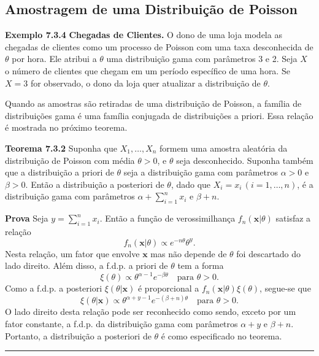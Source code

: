 \vspace{1cm}
\vspace{1cm}

\subsection*{Amostragem de uma Distribuição de Poisson}

\noindent\textbf{Exemplo 7.3.4} \quad \textbf{Chegadas de Clientes.} O dono de uma loja modela as chegadas de clientes como um processo de Poisson com uma taxa desconhecida de $\theta$ por hora. Ele atribui a $\theta$ uma distribuição gama com parâmetros 3 e 2. Seja $X$ o número de clientes que chegam em um período específico de uma hora. Se $X=3$ for observado, o dono da loja quer atualizar a distribuição de $\theta$.

\vspace{1cm}
Quando as amostras são retiradas de uma distribuição de Poisson, a família de distribuições gama é uma família conjugada de distribuições a priori. Essa relação é mostrada no próximo teorema.

\vspace{1cm}
\noindent\textbf{Teorema 7.3.2} \quad Suponha que $X_1, \dots, X_n$ formem uma amostra aleatória da distribuição de Poisson com média $\theta > 0$, e $\theta$ seja desconhecido. Suponha também que a distribuição a priori de $\theta$ seja a distribuição gama com parâmetros $\alpha > 0$ e $\beta > 0$. Então a distribuição a posteriori de $\theta$, dado que $X_i=x_i \, (i=1, \dots, n)$, é a distribuição gama com parâmetros $\alpha + \sum_{i=1}^{n}x_i$ e $\beta + n$.

\vspace{1cm}
\noindent\textbf{Prova} \quad Seja $y=\sum_{i=1}^{n}x_i$. Então a função de verossimilhança $f_n(\mathbf{x}|\theta)$ satisfaz a relação
$$ f_n(\mathbf{x}|\theta) \propto e^{-n\theta}\theta^y. $$
Nesta relação, um fator que envolve $\mathbf{x}$ mas não depende de $\theta$ foi descartado do lado direito. Além disso, a f.d.p. a priori de $\theta$ tem a forma
$$ \xi(\theta) \propto \theta^{\alpha-1}e^{-\beta\theta} \quad \text{para } \theta>0. $$
Como a f.d.p. a posteriori $\xi(\theta|\mathbf{x})$ é proporcional a $f_n(\mathbf{x}|\theta)\xi(\theta)$, segue-se que
$$ \xi(\theta|\mathbf{x}) \propto \theta^{\alpha+y-1}e^{-(\beta+n)\theta} \quad \text{para } \theta>0. $$
O lado direito desta relação pode ser reconhecido como sendo, exceto por um fator constante, a f.d.p. da distribuição gama com parâmetros $\alpha+y$ e $\beta+n$. Portanto, a distribuição a posteriori de $\theta$ é como especificado no teorema. \rule{0.5em}{0.5em}

